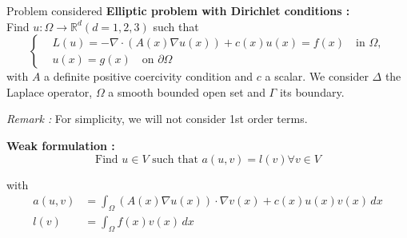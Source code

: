 \begin{frame}{Problem considered}
    \textbf{Elliptic problem with Dirichlet conditions :} \\
    Find $u : \Omega \rightarrow \mathbb{R}^d (d=1,2,3)$ such that
    \begin{equation}
    	\left\{\begin{aligned}
    		&L(u)=-\nabla \cdot (A(x) \nabla u(x)) + c(x)u(x) = f(x) \quad \text{in } \Omega, \\
    		&u(x) = g(x) \quad \text{on } \partial \Omega
    	\end{aligned}\right. \label{edp}
    \end{equation}
	with $A$ a definite positive coercivity condition and $c$ a scalar. We consider $\Delta$ the Laplace operator, $\Omega$ a smooth bounded open set and $\Gamma$ its boundary. 
	
	\footnotesize
	\textit{Remark :} For simplicity, we will not consider 1st order terms. 
	\normalsize
    
    \textbf{Weak formulation :}
    \begin{equation*}
    	\text{Find } u\in V \text{ such that } a(u, v) = l (v) \forall v\in V
    \end{equation*}
    
    with
    \begin{align*}
    	a(u,v)&=\int_{\Omega} (A(x)\nabla u(x)) \cdot \nabla v(x) + c(x)u(x)v(x) \, dx \\
    	l(v)&=\int_{\Omega} f(x)v(x) \, dx
    \end{align*}
\end{frame}

